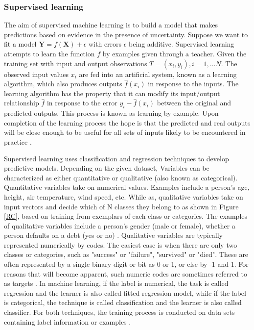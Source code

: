 \subsubsection{Supervised learning}
The aim of supervised machine learning is to build a model
that makes predictions based on evidence in the presence of
uncertainty. Suppose  we want to fit a model $\textbf{Y}=f(\textbf{X})+\epsilon$ with errors $\epsilon$ being additive. Supervised learning attempts to learn the function $f$ by examples given through a teacher. Given the training set with input and output observations $T=(x_i,y_i ), i=1,\dots N$. The observed input values $x_i$ are fed into an artificial system, known as a learning algorithm, which also produces outputs $\widehat{f}(x_i)$ in response to the inputs. The learning algorithm has the property that it can modify its input/output relationship $\widehat{f}$ in response to the error $y_i- \widehat{f} (x_i)$ between the original and predicted outputs. This process is known as learning by example. Upon completion of the learning process the hope is that the predicted and real outputs will be close enough to be useful for all sets of inputs likely to be encountered in practice \citep{friedman2001elements}.

Supervised learning uses classification and regression techniques
to develop predictive models. Depending on the given dataset, Variables can be characterized as either quantitative or qualitative (also known as categorical). Quantitative variables take on numerical values. Examples include a person's age, height, air temperature, wind speed, etc. While as, qualitative variables take on input vectors and decide which of N classes
they belong to as shown in Figure \ref{RC}, based on training from exemplars of each class or categories. The  
examples of qualitative variables include a person’s gender (male or female), whether a person defaults on a debt (yes or no) \citep{aitkin2009statistical}. Qualitative variables are typically represented numerically by codes. The easiest case is when there are only two classes or categories, such as "success"
or "failure", "survived" or "died". These are often represented by a single binary digit or bit as 0 or 1, or else by -1 and 1. For reasons that will become apparent, such numeric codes are sometimes referred to as targets \citep{friedman2001elements}. In machine learning, if the label is numerical, the task is called regression and the learner is also called fitted regression model, while if the label is categorical, the technique is called classification and the learner is also called classifier. For both techniques, the training process is conducted on data sets containing label information or examples \citep{zhou2012ensemble}.

